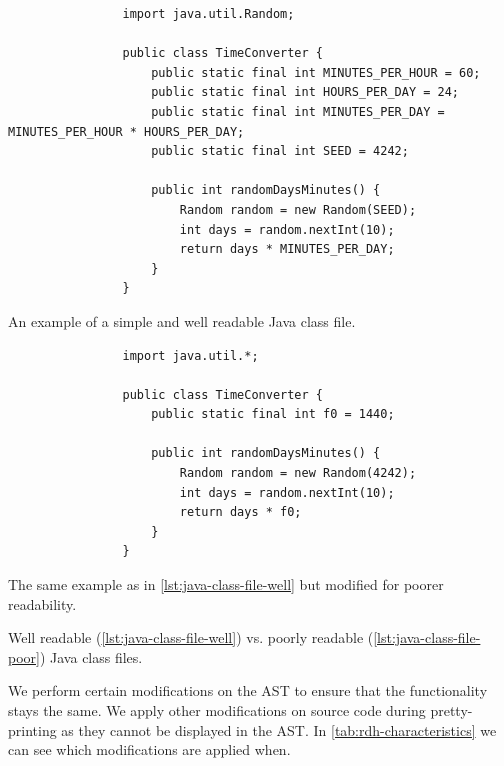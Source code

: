 \documentclass[%
class=scrreprt,
chapterprefix=false,%
open=right,%
twoside=false,%
paper=a4,%
logofile={Logo\_zentral\_farbig\_EN.png},%
thesistype=master,%
UKenglish,%
]{se2thesis}
\theoremstyle{definition}
\begin{document}
	
	\begin{listing}[tb]
		\begin{sublisting}{\linewidth}
			\begin{verbatim}
				import java.util.Random;
				
				public class TimeConverter {
					public static final int MINUTES_PER_HOUR = 60;
					public static final int HOURS_PER_DAY = 24;
					public static final int MINUTES_PER_DAY = MINUTES_PER_HOUR * HOURS_PER_DAY;
					public static final int SEED = 4242;
					
					public int randomDaysMinutes() {
						Random random = new Random(SEED);
						int days = random.nextInt(10);
						return days * MINUTES_PER_DAY;
					}
				}
			\end{verbatim}
			\caption{An example of a simple and well readable Java class file.}
			\label{lst:java-class-file-well}
		\end{sublisting}
		\vspace{1pt}
		
		\begin{sublisting}{\linewidth}
			\begin{verbatim}
				import java.util.*;
				
				public class TimeConverter {
					public static final int f0 = 1440;
					
					public int randomDaysMinutes() {
						Random random = new Random(4242);
						int days = random.nextInt(10);
						return days * f0;
					}
				}
			\end{verbatim}
			\caption{The same example as in \autoref{lst:java-class-file-well} but modified for poorer readability.}
			\label{lst:java-class-file-poor}
		\end{sublisting}
		\caption{Well readable (\autoref{lst:java-class-file-well}) vs. poorly readable (\autoref{lst:java-class-file-poor}) Java class files.}
		\label{lst:java-class-file}
	\end{listing}
	
	We perform certain modifications on the AST to ensure that the functionality stays the same.
	We apply other modifications on source code during pretty-printing as they cannot be displayed in the AST.
	In \autoref{tab:rdh-characteristics} we can see which modifications are applied when.
	
\end{document}
